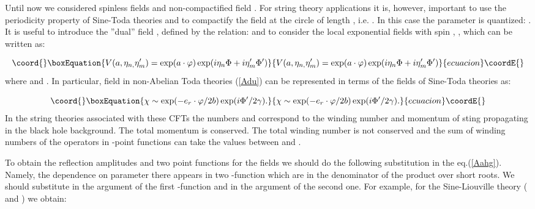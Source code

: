 \documentclass[a4paper,12pt]{article}
\begin{document}
Until now we considered spinless fields and non-compactified field \myHighlight{$\Phi $}\coordHE{}.
For string theory applications it is, however, important to use the
periodicity property of Sine-Toda theories and to compactify the field \myHighlight{$\Phi 
$}\coordHE{} at the circle of length \myHighlight{$2\pi /\gamma $}\coordHE{}, i.e. \coordHE{}. In this case the parameter \myHighlight{$\eta $}\coordHE{} is quantized: \coordHE{}. 
It is useful to introduce the ''dual'' field \myHighlight{$\Phi ^{\prime }$}\coordHE{}, defined by
the relation: \myHighlight{$\partial _\mu \Phi =\varepsilon _{\mu \nu}\partial_\nu \Phi
^{\prime }$}\coordHE{} and to consider the local exponential fields with spin 
\coordHE{}, \coordHE{}, which can be written as:

\begin{equation}\coord{}\boxEquation{
V(a,\eta _{n,}\eta _m^{\prime })=\exp (a\cdot \varphi )\exp (i\eta _n\Phi
+i\eta _m^{\prime }\Phi ^{\prime })  \label{Sfiel}
}{
V(a,\eta _{n,}\eta _m^{\prime })=\exp (a\cdot \varphi )\exp (i\eta _n\Phi
+i\eta _m^{\prime }\Phi ^{\prime })  }{ecuacion}\coordE{}\end{equation}
where \coordHE{} and \coordHE{}. In particular,
field \myHighlight{$\chi $}\coordHE{} in non-Abelian Toda theories (\ref{Adu}) can be represented in
terms of the fields of Sine-Toda theories as:

\begin{equation}\coord{}\boxEquation{
\chi \sim \exp (-e_r\cdot \varphi /2b)\exp (i\Phi ^{\prime }/2\gamma ).
\label{Qhi}
}{
\chi \sim \exp (-e_r\cdot \varphi /2b)\exp (i\Phi ^{\prime }/2\gamma ).
}{ecuacion}\coordE{}\end{equation}
In the string theories associated with these CFTs the numbers \coordHE{} and \coordHE{}
correspond to the winding number and momentum of sting propagating in the
black hole background. The total momentum is conserved. The total winding 
number is not conserved and the sum of winding numbers of the operators in 
\coordHE{}-point functions can take the values between \coordHE{} and \coordHE{}. 

To obtain the reflection amplitudes and two point
functions for the fields \coordHE{} we should do the
following substitution in the eq.(\ref{Aahg}). Namely,  
the dependence on parameter 
\myHighlight{$\eta $}\coordHE{} there appears in two \myHighlight{$\Gamma $}\coordHE{}-function which are in the denominator
of the product over short roots. We should substitute \coordHE{} in the argument of the first \myHighlight{$\Gamma $}\coordHE{}-function and \coordHE{} in the argument of the second one.  
For example,
for the Sine-Liouville theory (\coordHE{} and \coordHE{}) we
obtain:
\end{document}
